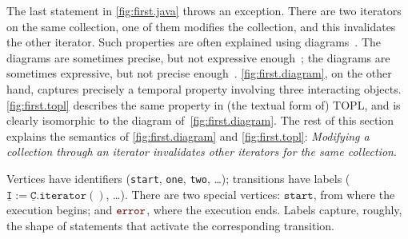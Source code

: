 \documentclass[preprint]{sigplanconf} %
\newcommand{\error}{\ensuremath{\textcolor{darkred}{\mathtt{error}}}\xspace}
\newcommand{\pattern}[1]{\ensuremath{\mathtt{\underline{#1}}}}
\newcommand{\start}{\ensuremath{\mathtt{start}}\xspace}
\theoremstyle{definition}
\theoremstyle{remark}
\begin{document}
The last statement in \autoref{fig:first.java} throws an exception.
There are two iterators on the same collection, one of them modifies the collection, and this invalidates the other iterator.
Such properties are often explained using diagrams~\cite{dblp:journals/scp/FieldGRY05,dblp:conf/issta/FinkYDRG06,dblp:conf/oopsla/BierhoffA07,dblp:conf/oopsla/naeeml08,dblp:conf/sigsoft/boddenlh08,dblp:conf/ecoop/BierhoffBA09}.
The diagrams are sometimes precise, but not expressive enough~\cite{dblp:journals/scp/FieldGRY05,dblp:conf/issta/FinkYDRG06};
the diagrams are sometimes expressive, but not precise enough~\cite{dblp:conf/oopsla/BierhoffA07,dblp:conf/oopsla/naeeml08,dblp:conf/sigsoft/boddenlh08,dblp:conf/ecoop/BierhoffBA09}.
\autoref{fig:first.diagram}, on the other hand, captures precisely a temporal property involving three interacting objects.
\autoref{fig:first.topl} describes the same property in (the textual form of) TOPL, and is clearly isomorphic to the diagram of~\autoref{fig:first.diagram}.
The rest of this section explains the semantics of \autoref{fig:first.diagram} and \autoref{fig:first.topl}:
\emph{Modifying a collection through an iterator invalidates other iterators for the same collection}.

Vertices have identifiers (\texttt{start}, \texttt{one}, \texttt{two}, \dots);
transitions have labels ($\pattern I:=\pattern C.\mathtt{iterator}()$, \dots).
There are two special vertices: \start, from where the execution begins; and \error, where the execution ends.
Labels capture, roughly, the shape of statements that activate the corresponding transition.
\end{document}
